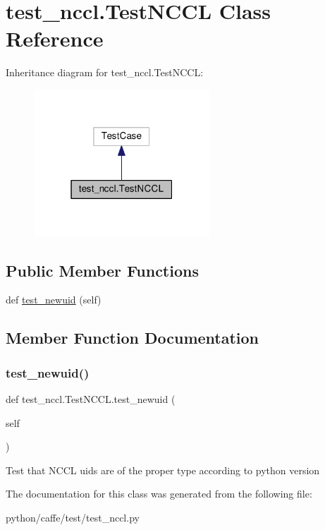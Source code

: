 \hypertarget{classtest__nccl_1_1_test_n_c_c_l}{}\section{test\+\_\+nccl.\+Test\+N\+C\+CL Class Reference}
\label{classtest__nccl_1_1_test_n_c_c_l}


Inheritance diagram for test\+\_\+nccl.\+Test\+N\+C\+CL\+:
\nopagebreak
\begin{figure}[H]
\begin{center}
\leavevmode
\includegraphics[width=187pt]{classtest__nccl_1_1_test_n_c_c_l__inherit__graph}
\end{center}
\end{figure}
\subsection*{Public Member Functions}
\begin{DoxyCompactItemize}
\item 
def \mbox{\hyperlink{classtest__nccl_1_1_test_n_c_c_l_af8f8c9eb5a70d55733b65871c5208f57}{test\+\_\+newuid}} (self)
\end{DoxyCompactItemize}


\subsection{Member Function Documentation}
\mbox{\label{classtest__nccl_1_1_test_n_c_c_l_af8f8c9eb5a70d55733b65871c5208f57}} 
\subsubsection{\texorpdfstring{test\+\_\+newuid()}{test\_newuid()}}
{\footnotesize\ttfamily def test\+\_\+nccl.\+Test\+N\+C\+C\+L.\+test\+\_\+newuid (\begin{DoxyParamCaption}\item[{}]{self }\end{DoxyParamCaption})}

\begin{DoxyVerb}Test that NCCL uids are of the proper type
according to python version
\end{DoxyVerb}
 

The documentation for this class was generated from the following file\+:\begin{DoxyCompactItemize}
\item 
python/caffe/test/test\+\_\+nccl.\+py\end{DoxyCompactItemize}
